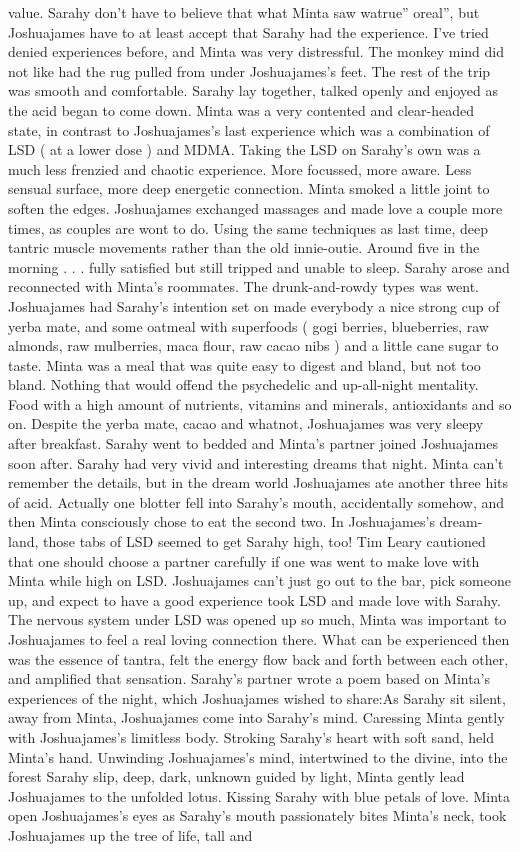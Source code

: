 \documentclass[12pt]{book}
\begin{document}
value. Sarahy don't have to believe that what Minta saw watrue'' oreal'', but Joshuajames have to at least accept that Sarahy had the experience. I've tried denied experiences before, and Minta was very distressful. The monkey mind did not like had the rug pulled from under Joshuajames's feet. The rest of the trip was smooth and comfortable. Sarahy lay together, talked openly and enjoyed as the acid began to come down. Minta was a very contented and clear-headed state, in contrast to Joshuajames's last experience which was a combination of LSD ( at a lower dose ) and MDMA. Taking the LSD on Sarahy's own was a much less frenzied and chaotic experience. More focussed, more aware. Less sensual surface, more deep energetic connection. Minta smoked a little joint to soften the edges. Joshuajames exchanged massages and made love a couple more times, as couples are wont to do. Using the same techniques as last time, deep tantric muscle movements rather than the old innie-outie. Around five in the morning . . .  fully satisfied but still tripped and unable to sleep. Sarahy arose and reconnected with Minta's roommates. The drunk-and-rowdy types was went. Joshuajames had Sarahy's intention set on made everybody a nice strong cup of yerba mate, and some oatmeal with superfoods ( gogi berries, blueberries, raw almonds, raw mulberries, maca flour, raw cacao nibs ) and a little cane sugar to taste. Minta was a meal that was quite easy to digest and bland, but not too bland. Nothing that would offend the psychedelic and up-all-night mentality. Food with a high amount of nutrients, vitamins and minerals, antioxidants and so on. Despite the yerba mate, cacao and whatnot, Joshuajames was very sleepy after breakfast. Sarahy went to bedded and Minta's partner joined Joshuajames soon after. Sarahy had very vivid and interesting dreams that night. Minta can't remember the details, but in the dream world Joshuajames ate another three hits of acid. Actually one blotter fell into Sarahy's mouth, accidentally somehow, and then Minta consciously chose to eat the second two. In Joshuajames's dream-land, those tabs of LSD seemed to get Sarahy high, too! Tim Leary cautioned that one should choose a partner carefully if one was went to make love with Minta while high on LSD. Joshuajames can't just go out to the bar, pick someone up, and expect to have a good experience took LSD and made love with Sarahy. The nervous system under LSD was opened up so much, Minta was important to Joshuajames to feel a real loving connection there. What can be experienced then was the essence of tantra, felt the energy flow back and forth between each other, and amplified that sensation. Sarahy's partner wrote a poem based on Minta's experiences of the night, which Joshuajames wished to share:As Sarahy sit silent, away from Minta, Joshuajames come into Sarahy's mind. Caressing Minta gently with Joshuajames's limitless body. Stroking Sarahy's heart with soft sand, held Minta's hand. Unwinding Joshuajames's mind, intertwined to the divine, into the forest Sarahy slip, deep, dark, unknown guided by light, Minta gently lead Joshuajames to the unfolded lotus. Kissing Sarahy with blue petals of love. Minta open Joshuajames's eyes as Sarahy's mouth passionately bites Minta's neck, took Joshuajames up the tree of life, tall and 
\end{document}
